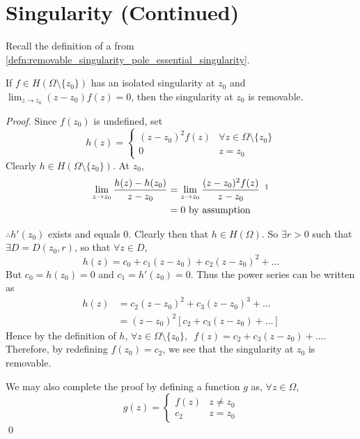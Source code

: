 \documentclass[11pt, oneside]{book}
\begin{document}
\section{Singularity (Continued)} %
\label{sec:singularity_continued}

Recall the definition of a  from \cref{defn:removable_singularity_pole_essential_singularity}.

\begin{thm}[Theorem 10]\label{thm:theorem_10}
	If $f \in H(\Omega \setminus \{z_0\})$ has an isolated singularity at $z_0$ and $\lim_{z \to z_0} (z - z_0) f(z) = 0$, then the singularity at $z_0$ is removable.
\end{thm}

\begin{proof}
	Since $f(z_0)$ is undefined, set
	\begin{equation*}
		h(z) = \begin{cases}
			(z - z_0)^2 f(z)	& \forall z \in \Omega \setminus \{z_0\} \\
			0					& z = z_0
		\end{cases}
	\end{equation*}
	Clearly $h \in H(\Omega \setminus \{z_0\})$. At $z_0$,
	\begin{align*}
		\lim_{z \to z_0} \frac{h(z) - h(z_0)}{z - z_0}
			&= \lim_{z \to z_0} \frac{(z - z_0)^2 f(z)}{z - z_0} \enspace \footnotemark \\
			&= 0 \text{ by assumption}
	\end{align*}


	$\therefore h'(z_0)$ exists and equals $0$. Clearly then that $h \in H(\Omega)$. So $\exists r > 0$ such that $\exists D = D(z_0, r)$, so that $\forall z \in D$,
	\begin{equation*}
		h(z) = c_0 + c_1 (z - z_0) + c_2 (z - z_0)^2 + \hdots
	\end{equation*}
	But $c_0 = h(z_0) = 0$ and $c_1 = h'(z_0) = 0$. Thus the power series can be written as
	\begin{align*}
		h(z) &= c_2 (z - z_0)^2 + c_3 (z - z_0)^3 + \hdots \\
			&= (z - z_0)^2 \left[ c_2 + c_3 (z - z_0) + \hdots \right]
	\end{align*}
	Hence by the definition of $h$, $\forall z \in \Omega \setminus \{z_0\}, \enspace f(z) = c_2 + c_3 (z - z_0) + \hdots$. Therefore, by redefining $f(z_0) = c_2$, we see that the singularity at $z_0$ is removable.

	We may also complete the proof by defining a function $g$ as, $\forall z \in \Omega$,
	\begin{equation*}
		g(z) = \begin{cases}
			f(z)		& z \neq z_0 \\
			c_2 		& z = z_0
		\end{cases}
	\end{equation*}\qed
\end{proof}
\end{document}
